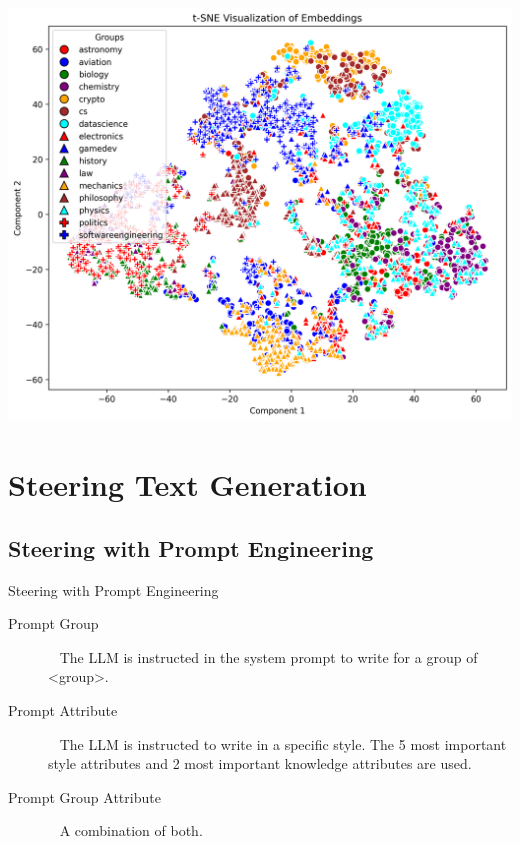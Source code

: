 \documentclass[]{beamer}
\begin{document}
\begin{frame}[plain]
  \includegraphics[width=\linewidth]{img/t-SNE-embedding.png}
\end{frame}


\section{Steering Text Generation}
\subsection{Steering with Prompt Engineering}
\begin{frame}{Steering with Prompt Engineering}
  \begin{description}
    \item[Prompt Group] ~\linebreak
          The LLM is instructed in the system prompt to write for a group of <group>.
    \item[Prompt Attribute] ~\linebreak
          The LLM is instructed to write in a specific style. The 5 most important style attributes and 2 most important knowledge attributes are used.
    \item[Prompt Group Attribute] ~\linebreak
          A combination of both.
  \end{description}
\end{frame}
\end{document}
